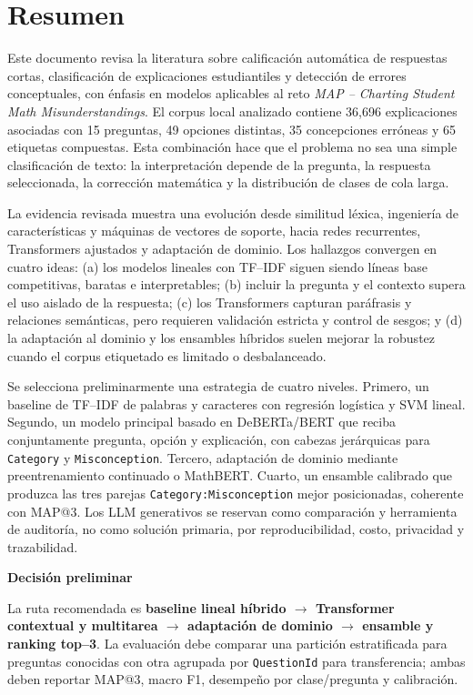 \documentclass[11pt,oneside,openany]{book}
\newenvironment{decision}[1][]{%
  \begin{lrbox}{\infobox}\begin{minipage}{0.92\textwidth}
  \color{GrisTexto}\sffamily\textbf{#1}\par\smallskip\rmfamily}
  {\end{minipage}\end{lrbox}\par\medskip\noindent
   \colorbox{VerdeClaro}{\usebox{\infobox}}\par\medskip}
\newcommand{\codigo}[1]{\texttt{#1}}
\begin{document}
\frontmatter

\chapter*{Resumen}

Este documento revisa la literatura sobre calificación automática de respuestas
cortas, clasificación de explicaciones estudiantiles y detección de errores
conceptuales, con énfasis en modelos aplicables al reto \emph{MAP -- Charting
Student Math Misunderstandings}. El corpus local analizado contiene 36,696
explicaciones asociadas con 15 preguntas, 49 opciones distintas, 35 concepciones
erróneas y 65 etiquetas compuestas. Esta combinación hace que el problema no sea una simple
clasificación de texto: la interpretación depende de la pregunta, la respuesta
seleccionada, la corrección matemática y la distribución de clases de cola larga.

La evidencia revisada muestra una evolución desde similitud léxica, ingeniería de
características y máquinas de vectores de soporte, hacia redes recurrentes,
Transformers ajustados y adaptación de dominio. Los hallazgos convergen en cuatro
ideas: (a) los modelos lineales con TF--IDF siguen siendo líneas base competitivas,
baratas e interpretables; (b) incluir la pregunta y el contexto supera el uso
aislado de la respuesta; (c) los Transformers capturan paráfrasis y relaciones
semánticas, pero requieren validación estricta y control de sesgos; y (d) la
adaptación al dominio y los ensambles híbridos suelen mejorar la robustez cuando
el corpus etiquetado es limitado o desbalanceado.

Se selecciona preliminarmente una estrategia de cuatro niveles. Primero, un
baseline de TF--IDF de palabras y caracteres con regresión logística y SVM lineal.
Segundo, un modelo principal basado en DeBERTa/BERT que reciba conjuntamente
pregunta, opción y explicación, con cabezas jerárquicas para \codigo{Category} y
\codigo{Misconception}. Tercero, adaptación de dominio mediante preentrenamiento
continuado o MathBERT. Cuarto, un ensamble calibrado que produzca las tres parejas
\codigo{Category:Misconception} mejor posicionadas, coherente con MAP@3. Los LLM
generativos se reservan como comparación y herramienta de auditoría, no como
solución primaria, por reproducibilidad, costo, privacidad y trazabilidad.

\begin{decision}[Decisión preliminar]
La ruta recomendada es \textbf{baseline lineal híbrido $\rightarrow$ Transformer
contextual y multitarea $\rightarrow$ adaptación de dominio $\rightarrow$
ensamble y ranking top--3}. La evaluación debe comparar una partición estratificada
para preguntas conocidas con otra agrupada por \codigo{QuestionId} para transferencia;
ambas deben reportar MAP@3, macro F1, desempeño por clase/pregunta y calibración.
\end{decision}
\end{document}
